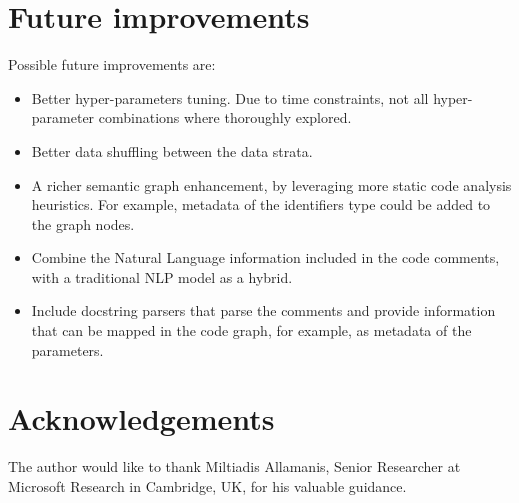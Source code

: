 \documentclass{article}
\begin{document}
\section{Future improvements}
Possible future improvements are: 
\begin{itemize}
  \item Better hyper-parameters tuning. Due to time constraints, not all hyper-parameter combinations where thoroughly explored.
  \item Better data shuffling between the data strata.
  \item A richer semantic graph enhancement, by leveraging more static code analysis heuristics. For example, metadata of the identifiers type could be added to the graph nodes.
  \item Combine the Natural Language information included in the code comments, with a traditional NLP model as a hybrid.
  \item Include docstring parsers that parse the comments and provide information that can be mapped in the code graph, for example, as metadata of the parameters.
\end{itemize}


\section*{Acknowledgements}
The author would like to thank Miltiadis Allamanis, Senior Researcher at Microsoft Research in Cambridge, UK, for his valuable guidance.

  
 
\end{document}
